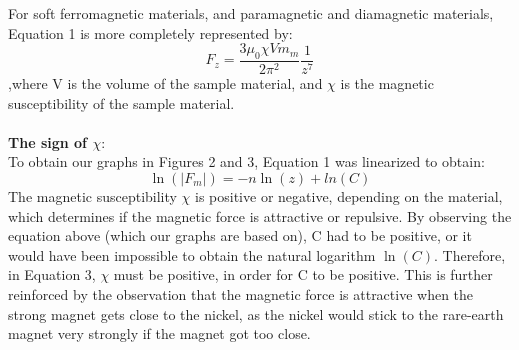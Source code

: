 \documentclass[letterpaper]{article}
\begin{document}
For soft ferromagnetic materials, and paramagnetic and diamagnetic materials, Equation 1 is more
completely represented by:
\begin{equation}
 F_z=\frac{3\mu_0\chi Vm_m}{2\pi^2}\frac{1}{z^7}
\end{equation}
,where V is the volume of the sample material, and $\chi$ is the magnetic susceptibility of the sample material.
\\ \\ \textbf{The sign of $\chi$}:\\
To obtain our graphs in Figures 2 and 3, Equation 1 was linearized to obtain:
$$\ln(|F_m|)=-n\ln(z)+ln(C)$$
The magnetic susceptibility $\chi$ is positive or negative, depending on the
material,
which determines if the magnetic force is attractive or repulsive.
By observing the equation above (which our graphs are based on), C had to be positive, or it would have been impossible to
obtain the natural logarithm $\ln(C)$.
Therefore, in Equation 3, $\chi$ must be positive, in order for C to be positive.
This is further reinforced by the observation that the magnetic force is attractive when the
strong magnet gets close to the nickel, as the nickel would stick to the rare-earth magnet very strongly if the magnet got too close.%
\end{document}
